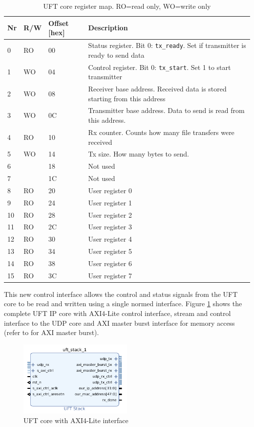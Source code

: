 \begin{table}[tb!]
    \centering
    \begin{tabular}{l l l p{10cm}}
        \toprule
		Nr & R/W & Offset [hex] & Description \\
        \midrule
		0 & RO & 00 & Status register. Bit 0: \texttt{tx\_ready}. Set if transmitter is
		ready to send data \\
		1 & WO & 04 & Control register. Bit 0: \texttt{tx\_start}. Set 1 to start
		transmitter \\
		2 & WO & 08 & Receiver base address. Received data is stored starting from this
		address \\
		3 & WO & 0C & Transmitter base address. Data to send is read from this address.
		\\
		4 & RO & 10 & Rx counter. Counts how many file transfers were received \\
		5 & WO & 14 & Tx size. How many bytes to send. \\
		6 & & 18 &  Not used\\
		7 & & 1C &  Not used\\
		8 & RO & 20 & User register 0 \\
		9 & RO & 24 & User register 1 \\
		10 & RO & 28 & User register 2 \\
		11 & RO & 2C & User register 3 \\
		12 & RO & 30 & User register 4 \\
		13 & RO & 34 & User register 5 \\
		14 & RO & 38 & User register 6 \\
		15 & RO & 3C & User register 7 \\
        \bottomrule
    \end{tabular}
    \caption{UFT core register map. RO=read only, WO=write only}
    \label{tab:uftaxiregmap}
\end{table}

This new control interface allows the control and status signals from the UFT
core to be read and written using a single normed interface. Figure 
\ref{fig:uftcoreaxilite} shows the complete UFT IP core with AXI4-Lite control
interface, stream and control interface to the UDP core and AXI master burst
interface for memory access (refer to \cite{p5report} for AXI master burst).

\begin{figure}[b!]
    \centering
    \includegraphics[width=0.5\textwidth] {images/dataflow/uftcoreaxilite.png}
    \caption{UFT core with AXI4-Lite interface}
    \label{fig:uftcoreaxilite}
\end{figure}

